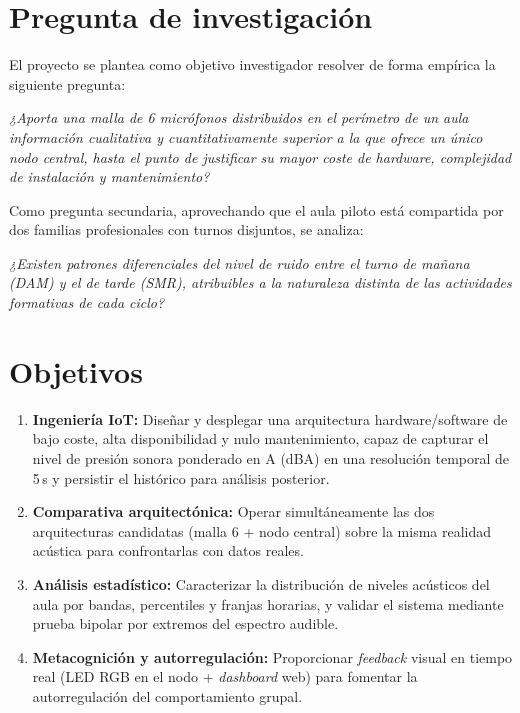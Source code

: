 \documentclass[11pt,a4paper,openany]{report}
\begin{document}
\section{Pregunta de investigaci\'on}

El proyecto se plantea como objetivo investigador resolver de forma emp\'irica la siguiente pregunta:

\begin{InfoBox}
\textit{¿Aporta una malla de 6 micr\'ofonos distribuidos en el per\'imetro de un aula informaci\'on cualitativa y cuantitativamente superior a la que ofrece un \'unico nodo central, hasta el punto de justificar su mayor coste de hardware, complejidad de instalaci\'on y mantenimiento?}
\end{InfoBox}

Como pregunta secundaria, aprovechando que el aula piloto est\'a compartida por dos familias profesionales con turnos disjuntos, se analiza:

\begin{InfoBox}
\textit{¿Existen patrones diferenciales del nivel de ruido entre el turno de ma\~nana (DAM) y el de tarde (SMR), atribuibles a la naturaleza distinta de las actividades formativas de cada ciclo?}
\end{InfoBox}

\section{Objetivos}

\begin{enumerate}
    \item \textbf{Ingenier\'ia IoT:} Dise\~nar y desplegar una arquitectura hardware/software de bajo coste, alta disponibilidad y nulo mantenimiento, capaz de capturar el nivel de presi\'on sonora ponderado en A (dBA) en una resoluci\'on temporal de 5\,s y persistir el hist\'orico para an\'alisis posterior.
    \item \textbf{Comparativa arquitect\'onica:} Operar simult\'aneamente las dos arquitecturas candidatas (malla 6 + nodo central) sobre la misma realidad ac\'ustica para confrontarlas con datos reales.
    \item \textbf{An\'alisis estad\'istico:} Caracterizar la distribuci\'on de niveles ac\'usticos del aula por bandas, percentiles y franjas horarias, y validar el sistema mediante prueba bipolar por extremos del espectro audible.
    \item \textbf{Metacognici\'on y autorregulaci\'on:} Proporcionar \emph{feedback} visual en tiempo real (LED RGB en el nodo + \emph{dashboard} web) para fomentar la autorregulaci\'on del comportamiento grupal.
\end{enumerate}
\end{document}
